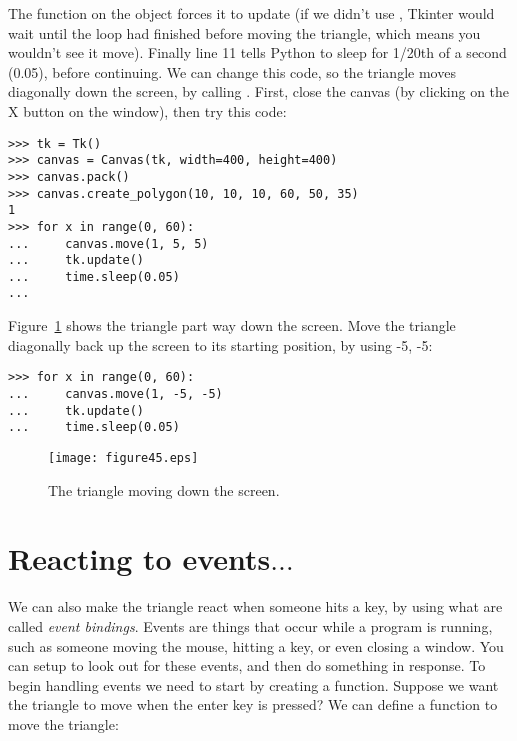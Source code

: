 The function  on the  object forces it to update (if we didn't use , Tkinter would wait until the loop had finished before moving the triangle, which means you wouldn't see it move). Finally line 11 tells Python to sleep for 1/20th of a second (0.05), before continuing. We can change this code, so the triangle moves diagonally down the screen, by calling .  First, close the canvas (by clicking on the X button on the window), then try this code:

\begin{listingignore}
\begin{verbatim}
>>> tk = Tk()
>>> canvas = Canvas(tk, width=400, height=400)
>>> canvas.pack()
>>> canvas.create_polygon(10, 10, 10, 60, 50, 35)
1
>>> for x in range(0, 60):
...     canvas.move(1, 5, 5)
...     tk.update()
...     time.sleep(0.05)
...
\end{verbatim}
\end{listingignore}

Figure~\ref{fig45} shows the triangle part way down the screen. Move the triangle diagonally back up the screen to its starting position, by using -5, -5:

\begin{listing}
\begin{verbatim}
>>> for x in range(0, 60):
...     canvas.move(1, -5, -5)
...     tk.update()
...     time.sleep(0.05)
\end{verbatim}
\end{listing}

\begin{figure}
\begin{center}
\texttt{[image: figure45.eps]}
\end{center}
\caption{The triangle moving down the screen.}\label{fig45}
\end{figure}

\section{Reacting to events$\ldots$}

We can also make the triangle react when someone hits a key, by using what are called \emph{event bindings}.  Events are things that occur while a program is running, such as someone moving the mouse, hitting a key, or even closing a window. You can setup  to look out for these events, and then do something in response. To begin handling events we need to start by creating a function. Suppose we want the triangle to move when the enter key is pressed? We can define a function to move the triangle:

